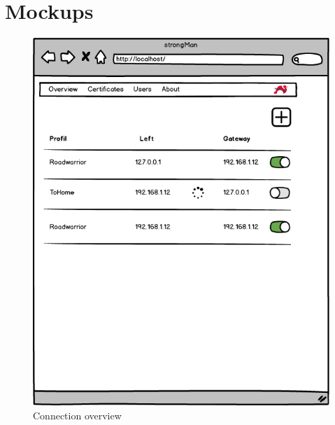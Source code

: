 \newpage
\chapter{Mockups}
\label{Mockups}
\begin{figure}[H]
	\centering
	\includegraphics[width=400pt]{images/mockups/con_overview.png}
	\caption{Connection overview}
\end{figure}

